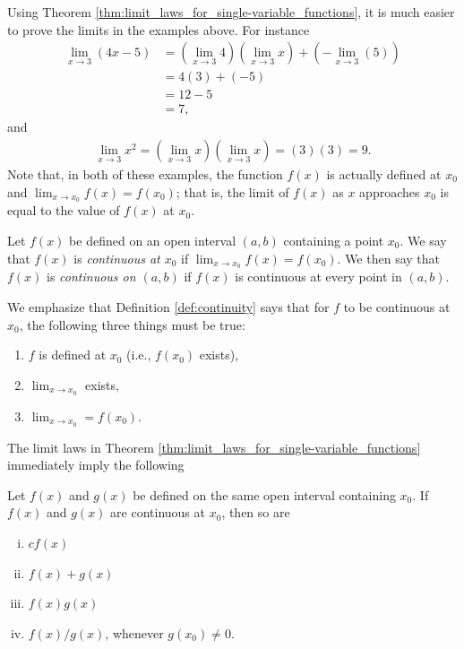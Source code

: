 \documentclass[12pt,letterpaper,reqno]{article}
\numberwithin{equation}{section}
\begin{document}
{Using Theorem \ref{thm:limit_laws_for_single-variable_functions}, it is much easier to prove the limits in the examples above. For instance
\begin{align*}
	\lim_{x \to 3}(4x-5)&=(\lim_{x \to 3}4)(\lim_{x \to 3}x)+(-\lim_{x \to 3}(5)) \\
	&=4(3)+(-5) \\
	&=12-5 \\
	&=7,
\end{align*}
and 
\begin{align*}
	\lim_{x \to 3}x^2=(\lim_{x \to 3}x)(\lim_{x \to 3}x)=(3)(3)=9.
\end{align*}
Note that, in both of these examples, the function $f(x)$ is actually defined at $x_0$ and $\lim_{x \to x_0}f(x)=f(x_0)$; that is, the limit of $f(x)$ as $x$ approaches $x_0$ is equal to the value of $f(x)$ at $x_0$.

\begin{defn}[Continuity]\label{def:continuity}
	Let $f(x)$ be defined on an open interval $(a,b)$ containing a point $x_0$. We say that $f(x)$ is \emph{continuous at $x_0$} if $\lim_{x \to x_0}f(x)=f(x_0)$. We then say that $f(x)$ is \emph{continuous on $(a,b)$} if $f(x)$ is continuous at every point in $(a,b)$.
\end{defn}
We emphasize that Definition \ref{def:continuity} says that for $f$ to be continuous at $x_0$, the following three things must be true:
\begin{enumerate}
	\item $f$ is defined at $x_0$ (i.e., $f(x_0)$ exists),
	\item $\lim_{x \to x_0}$ exists,
	\item $\lim_{x \to x_0}=f(x_0)$.
\end{enumerate}

The limit laws in Theorem \ref{thm:limit_laws_for_single-variable_functions} immediately imply the following

\begin{thm}\label{thm:new_continuous_functions_from_old}
	Let $f(x)$ and $g(x)$ be defined on the same open interval containing $x_0$. If $f(x)$ and $g(x)$ are continuous at $x_0$, then so are
	\begin{enumerate}[(i)]
		\item $cf(x)$
		\item $f(x)+g(x)$
		\item $f(x)g(x)$
		\item $f(x)/g(x)$, whenever $g(x_0) \neq 0$. 
	\end{enumerate}
\end{thm}

}
\end{document}
